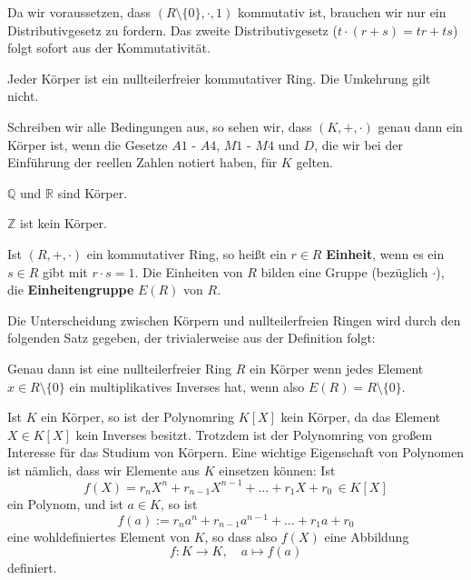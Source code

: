 \begin{notiz} Da wir voraussetzen, dass $(R \setminus \{0\}, \cdot, 1)$ kommutativ ist, brauchen wir nur 
ein Distributivgesetz zu fordern. Das zweite Distributivgesetz ($t \cdot (r+s) = tr + ts$) folgt sofort 
aus der Kommutativität.
\end{notiz}

\begin{notiz} Jeder Körper ist ein nullteilerfreier kommutativer Ring. Die Umkehrung gilt nicht.
\end{notiz}

\begin{notiz} Schreiben wir alle Bedingungen aus, so sehen wir, dass $(K, +, \cdot)$ genau dann ein Körper 
ist, wenn die Gesetze $A1$ - $A4$, $M1$ - $M4$ und $D$, die wir bei der Einführung der reellen Zahlen 
notiert haben, für $K$  gelten.
\end{notiz} 

\begin{beispiel} $\mathbb Q$ und $\mathbb R$ sind Körper. \end{beispiel}

\begin{beispiel} $\mathbb Z$ ist kein Körper. \end{beispiel}

\medbreak

\begin{notiz}\label{gruppe_einheitengruppe} Ist $(R, +, \cdot)$ ein kommutativer Ring, so heißt ein 
$r \in R$  \textbf{Einheit}, wenn es ein $s \in R$ gibt mit $r \cdot s = 1$. Die Einheiten von $R$ bilden 
eine Gruppe (bezüglich $\cdot$), die \textbf{Einheitengruppe} $E(R)$ von $R$. 
\end{notiz}


\bigbreak

Die Unterscheidung zwischen Körpern und nullteilerfreien Ringen wird durch den folgenden Satz gegeben, 
der trivialerweise aus der Definition folgt:

\begin{satz}\label{gruppe_ring_korper} 
Genau dann ist eine nullteilerfreier Ring $R$ ein Körper wenn jedes Element $x \in R \setminus 
\{0\}$ ein multiplikatives Inverses hat, wenn also $E(R) = R \setminus \{ 0 \}$.
\end{satz}

Ist $K$ ein Körper, so ist der Polynomring $K[X]$ kein Körper, da das Element $X \in K[X]$ kein Inverses besitzt. 
Trotzdem ist der Polynomring von großem Interesse für das Studium von Körpern. Eine wichtige Eigenschaft 
von Polynomen ist nämlich, dass wir Elemente aus $K$ einsetzen können: Ist 
  	$$ f(X) = r_n X^n + r_{n-1} X^{n-1} + \ldots + r_1 X + r_0 \, \in K[X] $$
ein Polynom, und ist $a \in K$, so ist 
  	$$ f(a) := r_n a^n + r_{n-1} a^{n-1} + \ldots + r_1 a + r_0  $$
eine wohldefiniertes Element von $K$, so dass also $f(X)$ eine Abbildung
  	$$ f: K \longrightarrow K, \quad a \mapsto f(a) $$
definiert. 

